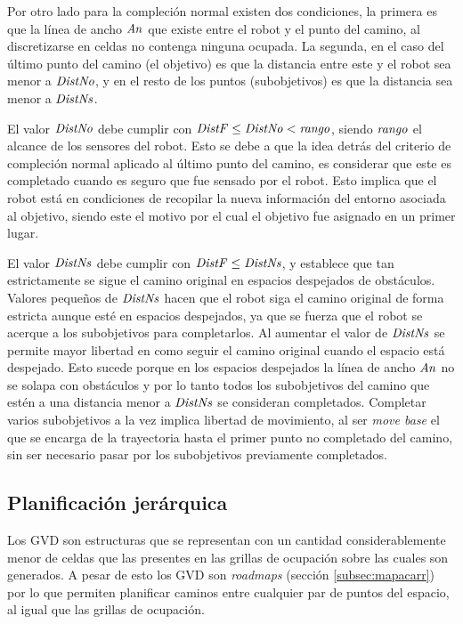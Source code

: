 Por otro lado para la compleción normal existen dos condiciones, la primera es
que la línea de ancho $\mathit{An}$ que existe entre el robot y el punto del camino,
al discretizarse en celdas no contenga ninguna ocupada. La segunda, en el
caso del último punto del camino (el objetivo) es que la distancia entre este y
el robot sea menor a $\mathit{DistNo}$, y en el resto de los puntos (subobjetivos)
es que la distancia sea menor a $\mathit{DistNs}$.

El valor $\mathit{DistNo}$ debe cumplir con $\mathit{DistF}\leq\mathit{DistNo}<\mathit{rango}$, siendo
$\mathit{rango}$ el alcance de los sensores del robot. Esto se debe a que la idea
detrás del criterio de compleción normal aplicado al último punto del camino, es
considerar que este es completado cuando es seguro que fue sensado por el robot.
Esto implica que el robot está en condiciones de recopilar la nueva información
del entorno asociada al objetivo, siendo este el motivo por el cual el objetivo
fue asignado en un primer lugar.

El valor $\mathit{DistNs}$ debe cumplir con $\mathit{DistF}\leq\mathit{DistNs}$, y
establece que tan estrictamente se sigue el camino original en espacios
despejados de obstáculos. Valores pequeños de $\mathit{DistNs}$ hacen que el robot
siga el camino original de forma estricta aunque esté en espacios despejados,
ya que se fuerza que el robot se acerque a los subobjetivos para completarlos.
Al aumentar el valor de $\mathit{DistNs}$ se permite mayor libertad en como seguir
el camino original cuando el espacio está despejado. Esto sucede porque en los
espacios despejados la línea de ancho $\mathit{An}$ no se solapa con obstáculos y
por lo tanto todos los subobjetivos del camino que estén a una distancia menor
a $\mathit{DistNs}$ se consideran completados. Completar varios subobjetivos a la
vez implica libertad de movimiento, al ser \emph{move base} el que se encarga
de la trayectoria hasta el primer punto no completado del camino, sin ser
necesario pasar por los subobjetivos previamente completados.

\subsection{Planificación jerárquica}
Los GVD son estructuras que se representan con un cantidad considerablemente
menor de celdas que las presentes en las grillas de ocupación sobre las cuales son
generados. A pesar de esto los GVD son \emph{roadmaps} (sección
\ref{subsec:mapacarr}) por lo que permiten planificar caminos entre cualquier
par de puntos del espacio, al igual que las grillas de ocupación. 

